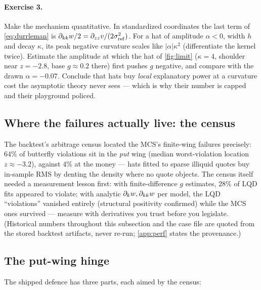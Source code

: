 \documentclass[11pt]{article}
\begin{document}
\paragraph{Exercise 3.}
Make the mechanism quantitative.  In standardized coordinates the last
term of \eqref{eq:durrleman} is
$\partial_{kk}w/2=\partial_{zz}v/(2\sigma_{\mathrm{ref}}^{2})$.
For a hat of amplitude $\alpha<0$, width $h$ and decay $\kappa$, its
peak negative curvature scales like $|\alpha|\kappa^{2}$ (differentiate
the kernel twice).  Estimate the amplitude at which the hat of
\cref{fig:limit} ($\kappa=4$, shoulder near $z=-2.8$, base
$g\approx0.2$ there) first pushes $g$ negative, and compare with the
drawn $\alpha=-0.07$.  Conclude that hats buy \emph{local} explanatory
power at a curvature cost the asymptotic theory never sees --- which is
why their number is capped and their playground policed.

\subsection{Where the failures actually live: the census}

The backtest's arbitrage census located the MCS's finite-wing failures
precisely: $64\%$ of butterfly violations sit in the \emph{put} wing
(median worst-violation location $z\approx-3.2$), against $4\%$ at the
money --- hats fitted to sparse illiquid quotes buy in-sample RMS by
denting the density where no quote objects.  The census itself needed a
measurement lesson first: with finite-difference $g$ estimates, $28\%$
of LQD fits appeared to violate; with analytic $\partial_kw,
\partial_{kk}w$ per model, the LQD ``violations'' vanished entirely
(structural positivity confirmed) while the MCS ones survived ---
measure with derivatives you trust before you legislate.  (Historical
numbers throughout this subsection and the case file are quoted from
the stored backtest artifacts, never re-run; \cref{app:perf} states the
provenance.)

\subsection{The put-wing hinge}

The shipped defence has three parts, each aimed by the census:
\end{document}
